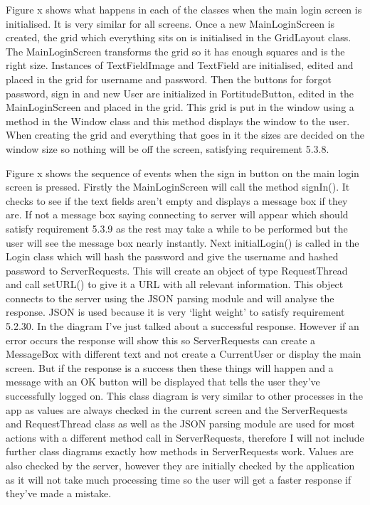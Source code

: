 Figure x shows what happens in each of the classes when the main login screen is initialised. It is very similar for all screens. Once a new MainLoginScreen is created, the grid which everything sits on is initialised in the GridLayout class. The MainLoginScreen transforms the grid so it has enough squares and is the right size. Instances of TextFieldImage and TextField are initialised, edited and placed in the grid for username and password. Then the buttons for forgot password, sign in and new User are initialized in FortitudeButton, edited in the MainLoginScreen and placed in the grid. This grid is put in the window using a method in the Window class and this method displays the window to the user. When creating the grid and everything that goes in it the sizes are decided on the window size so nothing will be off the screen, satisfying requirement 5.3.8.

Figure x shows the sequence of events when the sign in button on the main login screen is pressed. Firstly the MainLoginScreen will call the method signIn(). It checks to see if the text fields aren't empty and displays a message box if they are. If not a message box saying connecting to server will appear which should satisfy requirement 5.3.9 as the rest may take a while to be performed but the user will see the message box nearly instantly. Next initialLogin() is called in the Login class which will hash the password and give the username and hashed password to ServerRequests. This will create an object of type RequestThread and call setURL() to give it a URL with all relevant information. This object connects to the server using the JSON parsing module and will analyse the response. JSON is used because it is very `light weight' to satisfy requirement 5.2.30. In the diagram I've just talked about a successful response. However if an error occurs the response will show this so ServerRequests can create a MessageBox with different text and not create a CurrentUser or display the main screen. But if the response is a success then these things will happen and a message with an OK button will be displayed that tells the user they've successfully logged on. This class diagram is very similar to other processes in the app as values are always checked in the current screen and the ServerRequests and RequestThread class as well as the JSON parsing module are used for most actions with a different method call in ServerRequests, therefore I will not include further class diagrams exactly how methods in ServerRequests work. Values are also checked by the server, however they are initially checked by the application as it will not take much processing time so the user will get a faster response if they've made a mistake.

